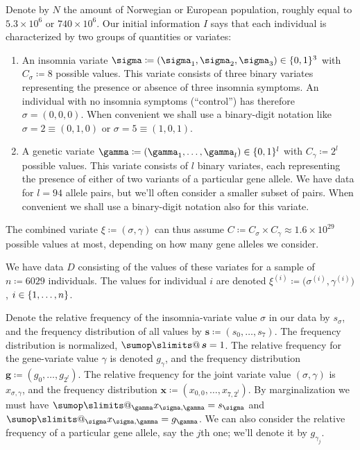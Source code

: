 \documentclass[\ifafour a4paper,12pt,\else a5paper,10pt,\fi%
onecolumn,oneside,article,%
british%
]{memoir}
\makeatletter
\theoremstyle{remark}
\theoremstyle{innote}
\def\sum{\DOTSI\sumop\slimits@}
\newcommand*{\defd}{\coloneqq}
\DeclarePairedDelimiter\set{\{}{\}}
\renewcommand*{\|}{\mathpunct{|}}
\newcommand*{\tsum}{\mathop{\textstyle\sum}\nolimits}
\newcommand*{\yD}{D}
\newcommand*{\yI}{I}
\newcommand*{\ysum}{\tsum}
\newcommand*{\ys}{\sigma}
\newcommand*{\yg}{\gamma}
\newcommand*{\gn}{l}
\newcommand*{\ysi}[1]{\ys^{(#1)}}
\newcommand*{\ygi}[1]{\yg^{(#1)}}
\newcommand*{\yfs}{\bm{s}}
\newcommand*{\yfg}{\bm{g}}
\newcommand*{\yv}{\xi}
\newcommand*{\yvi}[1]{\yv^{(#1)}}
\newcommand*{\yf}{\bm{x}}
\newcommand*{\yCs}{C_{\sigma}}
\newcommand*{\yCg}{C_{\gamma}}
\makeatother
\begin{document}
Denote by $N$ the amount of Norwegian or European population, roughly equal
to $5.3 \times 10^6$ or $740 \times 10^6$. Our initial information $\yI$
says that each individual is characterized by two groups of quantities or
variates:
\begin{enumerate}
\item An insomnia variate $\ys \defd (\ys_1,\ys_2,\ys_3)\in \set{0,1}^3$
  with $\yCs\defd 8$ possible values. This variate consists of three
  binary variates representing the presence or absence of three insomnia
  symptoms. An individual with no insomnia symptoms (\enquote{control}) has
  therefore $\ys=(0,0,0)$. When convenient we shall use a binary-digit
  notation like $\ys=2\equiv (0,1,0)$ or $\ys=5\equiv(1,0,1)$.
\item A genetic variate
  $\yg \defd (\yg_1,\dotsc,\yg_{\gn})\in \set{0,1}^{\gn}$ with
  $\yCg \defd 2^{\gn}$ possible values. This variate consists of $\gn$
  binary variates, each representing the presence of either of two variants
  of a particular gene allele. We have data for $\gn=94$ allele pairs, but
  we'll often consider a smaller subset of pairs. When convenient we shall
  use a binary-digit notation also for this variate.
\end{enumerate}
The combined variate $\yv \defd (\ys,\yg)$ can thus assume
$C\defd \yCs\times\yCg \approx 1.6 \times 10^{29}$ possible values at most,
depending on how many gene alleles we consider.

We have data $\yD$ consisting of the values of these variates for a sample
of $n\defd 6029$ individuals. The values for individual $i$ are denoted
$\yvi{i} \defd \bigl( \ysi{i}, \ygi{i} \bigr)$, $i \in \set{1,\dotsc,n}$.

Denote the relative frequency of the insomnia-variate value $\ys$ in our
data by $s_{\ys}$, and the frequency distribution of all values by
$\yfs\defd(s_0,\dotsc,s_7)$. The frequency distribution is normalized,
$\ysum\yfs=1$. The relative frequency for the gene-variate value $\yg$ is
denoted $g_{\yg}$, and the frequency distribution
$\yfg \defd (g_0,\dotsc,g_{2^{\gn}})$. The relative frequency for the joint
variate value $(\ys,\yg)$ is $x_{\ys,\yg}$, and the frequency distribution
$\yf \defd (x_{0,0},\dotsc, x_{7,2^{\gn}})$. By marginalization we must
have $\sum_{\yg} x_{\ys,\yg} = s_{\ys}$ and
$\sum_{\ys} x_{\ys,\yg} = g_{\yg}$. We can also consider the relative
frequency of a particular gene allele, say the $j$th one; we'll denote it
by $g_{\yg_j}$.

\medskip
\end{document}

